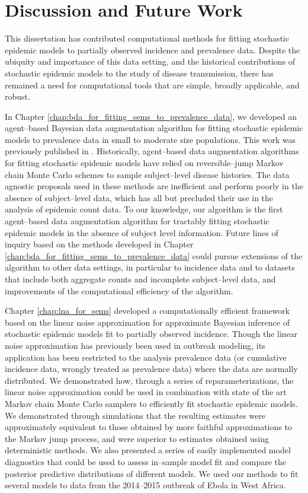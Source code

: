 \chapter{Discussion and Future Work}
\label{chap:conclusion}

This dissertation has contributed computational methods for fitting stochastic epidemic models to partially observed incidence and prevalence data. Despite the ubiquity and importance of this data setting, and the historical contributions of stochastic epidemic models to the study of disease transmission, there has remained a need for computational tools that are simple, broadly applicable, and robust. 

In Chapter \ref{chap:bda_for_fitting_sems_to_prevalence_data}, we developed an agent--based Bayesian data augmentation algorithm for fitting stochastic epidemic models to prevalence data in small to moderate size populations. This work was previously published in \cite{fintzi2017efficient}. Historically, agent--based data augmentation algorithms for fitting stochastic epidemic models have relied on reversible--jump Markov chain Monte Carlo schemes to sample subject--level disease histories. The data agnostic proposals used in these methods are inefficient and perform poorly in the absence of subject--level data, which has all but precluded their use in the analysis of epidemic count data. To our knowledge, our algorithm is the first agent--based data augmentation algorithm for tractably fitting stochastic epidemic models in the absence of subject level information. Future lines of inquiry based on the methods developed in Chapter \ref{chap:bda_for_fitting_sems_to_prevalence_data} could pursue extensions of the algorithm to other data settings, in particular to incidence data and to datasets that include both aggregate counts and incomplete subject--level data, and improvements of the computational efficiency of the algorithm.

Chapter \ref{chap:lna_for_sems} developed a computationally efficient framework based on the linear noise approximation for approximate Bayesian inference of stochastic epidemic models fit to partially observed incidence. Though the linear noise approximation has previously been used in outbreak modeling, its application has been restricted to the analysis prevalence data (or cumulative incidence data, wrongly treated as prevalence data) where the data are normally distributed. We demonstrated how, through a series of reparameterizations, the linear noise approximation could be used in combination with state of the art Markov chain Monte Carlo samplers to efficiently fit stochastic epidemic models. We demonstrated through simulations that the resulting estimates were approximately equivalent to those obtained by more faithful approximations to the Markov jump process, and were superior to estimates obtained using deterministic methods. We also presented a series of easily implemented model diagnostics that could be used to assess in--sample model fit and compare the posterior predictive distributions of different models. We used our methods to fit several models to data from the 2014--2015 outbreak of Ebola in West Africa. 

